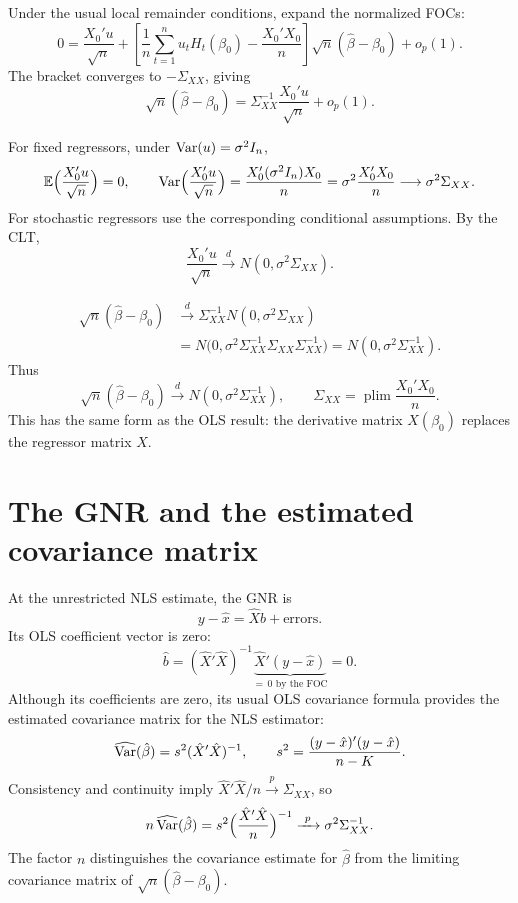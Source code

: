 \documentclass[11pt]{article}
\begin{document}
Under the usual local remainder conditions, expand the normalized FOCs:
\[ 0=\frac{X_{0}'u}{\sqrt{n}}
   +\left[\frac{1}{n}\sum_{t=1}^{n}u_{t}H_{t}(\beta_{0})
          -\frac{X_{0}'X_{0}}{n}\right]\sqrt{n}(\hat\beta-\beta_{0})+o_{p}(1). \]
The bracket converges to $-\Sigma_{XX}$, giving
\[ \sqrt{n}(\hat\beta-\beta_{0})
   =\Sigma_{XX}^{-1}\frac{X_{0}'u}{\sqrt{n}}+o_{p}(1). \]

For fixed regressors, under $\operatorname{Var}(u)=\sigma^{2}I_{n}$,
\[ \mathbb{E}\Bigl(\frac{X_{0}'u}{\sqrt{n}}\Bigr)=0, \qquad
   \operatorname{Var}\Bigl(\frac{X_{0}'u}{\sqrt{n}}\Bigr)
      =\frac{X_{0}'(\sigma^{2}I_{n})X_{0}}{n}
      =\sigma^{2}\frac{X_{0}'X_{0}}{n}\longrightarrow\sigma^{2}\Sigma_{XX}. \]
For stochastic regressors use the corresponding conditional assumptions. By the CLT,
\[ \frac{X_{0}'u}{\sqrt{n}}\xrightarrow{\ d\ }N(0,\sigma^{2}\Sigma_{XX}). \]

\begin{align*}
 \sqrt{n}(\hat\beta-\beta_{0})
 &\xrightarrow{\ d\ }\Sigma_{XX}^{-1}N(0,\sigma^{2}\Sigma_{XX})\\
 &=N\bigl(0,\sigma^{2}\Sigma_{XX}^{-1}\Sigma_{XX}\Sigma_{XX}^{-1}\bigr)
 =N(0,\sigma^{2}\Sigma_{XX}^{-1}).
\end{align*}
Thus
\[ \boxed{\sqrt{n}(\hat\beta-\beta_{0})\xrightarrow{\ d\ }
   N(0,\sigma^{2}\Sigma_{XX}^{-1})}, \qquad
   \Sigma_{XX}=\operatorname*{plim}\frac{X_{0}'X_{0}}{n}. \]
This has the same form as the OLS result: the derivative matrix $X(\beta_{0})$
replaces the regressor matrix $X$.

\section{The GNR and the estimated covariance matrix}

At the unrestricted NLS estimate, the GNR is
\[ y-\hat x=\hat Xb+\text{errors}. \]
Its OLS coefficient vector is zero:
\[ \hat b=(\hat X'\hat X)^{-1}
   \underbrace{\hat X'(y-\hat x)}_{=\,0\text{ by the FOC}}=0. \]
Although its coefficients are zero, its usual OLS covariance formula provides
the estimated covariance matrix for the NLS estimator:
\[ \widehat{\operatorname{Var}}(\hat\beta)=s^{2}(\hat X'\hat X)^{-1},
   \qquad s^{2}=\frac{(y-\hat x)'(y-\hat x)}{n-K}. \]
Consistency and continuity imply $\hat X'\hat X/n\xrightarrow{p}\Sigma_{XX}$, so
\[ n\,\widehat{\operatorname{Var}}(\hat\beta)
   =s^{2}\Bigl(\frac{\hat X'\hat X}{n}\Bigr)^{-1}
      \xrightarrow{\ p\ }\sigma^{2}\Sigma_{XX}^{-1}. \]
The factor $n$ distinguishes the covariance estimate for $\hat\beta$ from the
limiting covariance matrix of $\sqrt{n}(\hat\beta-\beta_{0})$.
\end{document}
